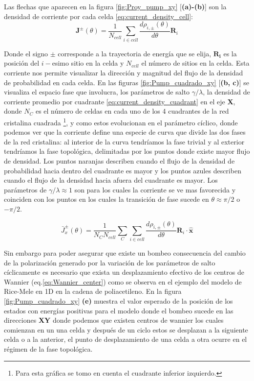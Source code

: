 Las flechas que aparecen en la figura \ref{fig:Proy_pump_xy} [\textbf{(a)-(b)}] son la densidad de corriente por cada celda \ref{eq:current_density_cell}:
\begin{equation}
    \label{eq:current_density_cell}
    \mathbf{J}^{\pm}(\theta) = \frac{1}{N_{cell}}\sum_{i \in cell} \frac{d \rho_{i,\pm}(\theta)}{d\theta} \mathbf{R}_i  
\end{equation}

Donde el signo $\pm$ corresponde a la trayectoria de energía que se elija, $\mathbf{R_i}$ es la posición del $i-$esimo sitio en la celda y $N_{cell}$ el número de sitios en la celda. Esta corriente nos permite visualizar la dirección y magnitud del flujo de la densidad de probabilidad en cada celda. En las figuras \ref{fig:Pump_cuadrado_xy} [\textbf{(b, c)}] se visualiza el espacio fase que involucra, los parámetros de salto $\gamma/\lambda$, la densidad de corriente promedio por cuadrante \ref{eq:current_density_cuadrant} en el eje \textbf{X}, donde $N_C$ es el número de celdas en cada uno de los 4 cuadrantes de la red cristalina cuadrada \footnote{Para esta gráfica se tomo en cuenta el cuadrante inferior izquierdo.}, y como estos evolucionan en el parámetro cíclico, donde podemos ver que la corriente define una especie de curva que divide las dos fases de la red cristalina: al interior de la curva tendríamos la fase trivial y al exterior tendríamos la fase topológica, delimitadas por los puntos donde existe mayor flujo de densidad. Los puntos naranjas describen cuando el flujo de la densidad de probabilidad hacia dentro del cuadrante es mayor y los puntos azules describen cuando el flujo de la densidad hacia afuera del cuadrante es mayor. Los parámetros de $\gamma/\lambda \approx 1$ son para los cuales la corriente se ve mas favorecida y coinciden con los puntos en los cuales la transición de fase sucede en $\theta \approx \pi/2 $ o $-\pi/2$.

\begin{equation}
    \label{eq:current_density_cuadrant}
    \bar{J}^{\pm}_x(\theta) =\frac{1}{N_C N_{cell}} \sum_{C} \sum_{i \in cell} \frac{d \rho_{i,\pm}(\theta)}{d\theta} \mathbf{R}_i \cdot \mathbf{\hat{x}}  
\end{equation}

Sin embargo para poder asegurar que existe un bombeo consecuencia del cambio de la polarización generado por la variación de los parámetros de salto cíclicamente es necesario que exista un desplazamiento efectivo de los centros de Wannier (eq.\ref{eq:Wannier_center}) como se observa en el ejemplo del modelo de Rice-Mele en 1D en la cadena de poliacetileno. En la figura \ref{fig:Pump_cuadrado_xy} \textbf{(e)} muestra el valor esperado de la posición de los estados con energías positivas para el modelo donde el bombeo sucede en las direcciones \textbf{XY} donde podemos que existen centros de wannier los cuales comienzan en un una celda y después de un ciclo estos se desplazan a la siguiente celda o a la anterior, el punto de desplazamiento de una celda a otra ocurre en el régimen de la fase topológica. 

